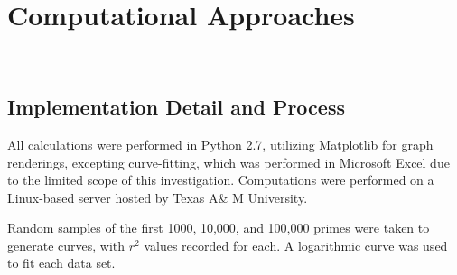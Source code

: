 \documentclass[11pt]{article}
\begin{document}


\section{Computational Approaches}$ $
\subsection{Implementation Detail and Process}
All calculations were performed in Python 2.7, utilizing Matplotlib for graph renderings, excepting curve-fitting, which was performed in Microsoft Excel due to the limited scope of this investigation. Computations were performed on a Linux-based server hosted by Texas A\& M University. 

 Random samples of the first 1000, 10,000, and 100,000 primes were taken to generate curves, with $r^{2}$ values recorded for each. A logarithmic curve was used to fit each data set.
\end{document}
